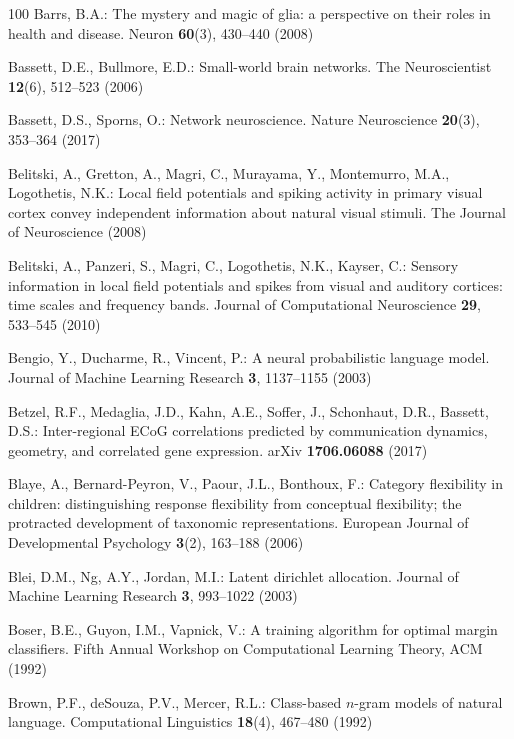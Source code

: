 \documentclass[runningheads]{llncs}
\begin{document}
\begin{thebibliography}{100}
Barrs, B.A.: The mystery and magic of glia: a perspective on their roles in
  health and disease. Neuron  \textbf{60}(3),  430--440 (2008)

Bassett, D.E., Bullmore, E.D.: Small-world brain networks. The Neuroscientist
  \textbf{12}(6),  512--523 (2006)

Bassett, D.S., Sporns, O.: Network neuroscience. Nature Neuroscience
  \textbf{20}(3),  353--364 (2017)

Belitski, A., Gretton, A., Magri, C., Murayama, Y., Montemurro, M.A.,
  Logothetis, N.K.: Local field potentials and spiking activity in primary
  visual cortex convey independent information about natural visual stimuli.
  The Journal of Neuroscience  (2008)

Belitski, A., Panzeri, S., Magri, C., Logothetis, N.K., Kayser, C.: Sensory
  information in local field potentials and spikes from visual and auditory
  cortices: time scales and frequency bands. Journal of Computational
  Neuroscience  \textbf{29},  533--545 (2010)

Bengio, Y., Ducharme, R., Vincent, P.: A neural probabilistic language model.
  Journal of Machine Learning Research  \textbf{3},  1137--1155 (2003)

Betzel, R.F., Medaglia, J.D., Kahn, A.E., Soffer, J., Schonhaut, D.R., Bassett,
  D.S.: Inter-regional {ECoG} correlations predicted by communication dynamics,
  geometry, and correlated gene expression. {arXiv}  \textbf{1706.06088} (2017)

Blaye, A., Bernard-Peyron, V., Paour, J.L., Bonthoux, F.: Category flexibility
  in children: distinguishing response flexibility from conceptual flexibility;
  the protracted development of taxonomic representations. {European} Journal
  of Developmental Psychology  \textbf{3}(2),  163--188 (2006)

Blei, D.M., Ng, A.Y., Jordan, M.I.: Latent dirichlet allocation. Journal of
  Machine Learning Research  \textbf{3},  993--1022 (2003)

Boser, B.E., Guyon, I.M., Vapnick, V.: A training algorithm for optimal margin
  classifiers. Fifth Annual Workshop on Computational Learning Theory, {ACM}
  (1992)

Brown, P.F., {deSouza}, P.V., Mercer, R.L.: Class-based $n$-gram models of
  natural language. Computational Linguistics  \textbf{18}(4),  467--480 (1992)


\end{thebibliography}
\end{document}
